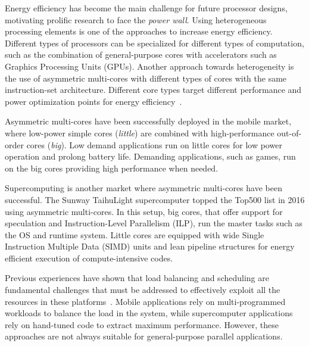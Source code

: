 \iffalse
Energy efficiency has become the main 
challenge for future processor designs, motivating prolific research to face the 
\emph{power wall}. Using heterogeneous processing elements is one of the 
approaches to increase energy efficiency. Different types of processors can 
be specialized for different types of computation, such as the combination of 
general-purpose cores with accelerators such as Graphics Processing Units (GPUs). 
Another approach towards heterogeneity is the use of asymmetric multi-cores 
with different types of cores with the same instruction-set architecture. Different core types 
target different performance and power optimization points for energy
efficiency~\cite{Kumar:ISCA2004,Balakrishnan:ISCA2005}. 

Asymmetric multi-cores have been successfully deployed in the mobile market, where 
low-power simple cores (\emph{little}) are combined with 
high-performance out-of-order cores (\emph{big}). Low demand applications
run on little cores for low power operation and prolong battery life. Demanding
applications, such as games, run on the big cores providing high performance
when needed.

Supercomputing is another market where asymmetric multi-cores have been successful. 
The Sunway TaihuLight supercomputer topped the Top500 list in 2016 using asymmetric multi-cores. 
In this setup, big cores, that offer support for speculation and Instruction-Level Parallelism (ILP), run the master tasks such as the OS and runtime system.
Little cores are equipped with wide Single Instruction Multiple Data (SIMD) units and lean pipeline structures for energy efficient execution of compute-intensive codes. 

Previous experiences have shown that load balancing and scheduling are fundamental challenges that 
must be addressed to effectively exploit all the resources in these 
platforms~\cite{Suleman:APLOS2009,Fedorova2009,Greenhalgh2011,Joao:ASPLOS2012,Joao:ISCA2013,
ARM4HPC_SC13}. 
Mobile applications rely on multi-programmed workloads to balance the load in the 
system, while supercomputer applications rely on hand-tuned code to extract maximum 
performance. However, these approaches are not always suitable for general-purpose parallel 
applications.

